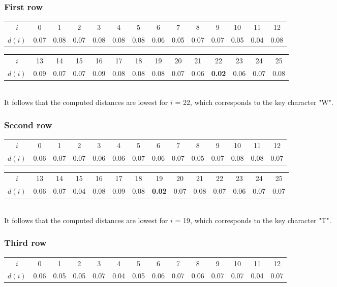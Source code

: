 \documentclass[11pt]{report}
\begin{document}
\subsubsection{First row}
\begin{tabular}{| c | c c c c c c c c c c c c c |}
\hline
$i$ & 0 & 1 & 2 & 3 & 4 & 5 & 6 & 7 & 8 & 9 & 10 & 11 & 12\\
$d(i)$ & 0.07 & 0.08 & 0.07 & 0.08 & 0.08 & 0.08 & 0.06 & 0.05 & 0.07 & 0.07 & 0.05 & 0.04 & 0.08\\
\hline
\end{tabular}
\begin{tabular}{| c | c c c c c c c c c c c c c |}
\hline
$i$ & 13 & 14 & 15 & 16 & 17 & 18 & 19 & 20 & 21 & 22 & 23 & 24 & 25\\
$d(i)$ & 0.09 & 0.07 & 0.07 & 0.09 & 0.08 & 0.08 & 0.08 & 0.07 & 0.06 & \textbf{0.02} & 0.06 & 0.07 & 0.08\\
\hline
\end{tabular}
${}$\\
It follows that the computed distances are lowest for $i$ = 22, which corresponds to the key
character "W".

\subsubsection{Second row}
\begin{tabular}{| c | c c c c c c c c c c c c c |}
\hline
$i$ & 0 & 1 & 2 & 3 & 4 & 5 & 6 & 7 & 8 & 9 & 10 & 11 & 12\\
$d(i)$ & 0.06 & 0.07 & 0.07 & 0.06 & 0.06 & 0.07 & 0.06 & 0.07 & 0.05 & 0.07 & 0.08 & 0.08 & 0.07\\
\hline
\end{tabular}
\begin{tabular}{| c | c c c c c c c c c c c c c |}
\hline
$i$ & 13 & 14 & 15 & 16 & 17 & 18 & 19 & 20 & 21 & 22 & 23 & 24 & 25\\
$d(i)$ 
& 0.06
& 0.07
& 0.04
& 0.08
& 0.09
& 0.08
& \textbf{0.02}
& 0.07
& 0.08
& 0.07
& 0.06
& 0.07
& 0.07\\
\hline
\end{tabular}
${}$\\
It follows that the computed distances are lowest for $i$ = 19, which corresponds to the key
character "T".

\subsubsection{Third row}
\begin{tabular}{| c | c c c c c c c c c c c c c |}
\hline
$i$ & 0 & 1 & 2 & 3 & 4 & 5 & 6 & 7 & 8 & 9 & 10 & 11 & 12\\
$d(i)$ & 0.06
& 0.05
& 0.05
& 0.07
& 0.04
& 0.05
& 0.06
& 0.07
& 0.06
& 0.07
& 0.07
& 0.04
& 0.07\\
\hline
\end{tabular}
\end{document}
